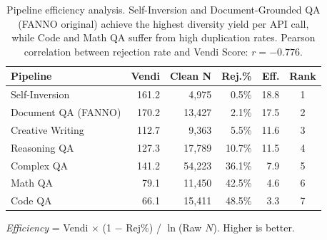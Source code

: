 \begin{table}[t]
\centering
\caption{Pipeline efficiency analysis. Self-Inversion and Document-Grounded QA (FANNO original) achieve the highest diversity yield per API call, while Code and Math QA suffer from high duplication rates. Pearson correlation between rejection rate and Vendi Score: $r=-0.776$.}
\label{tab:efficiency}
\small
\begin{tabular}{lrrrrc}
\toprule
\textbf{Pipeline} & \textbf{Vendi} & \textbf{Clean N} & \textbf{Rej.\%} & \textbf{Eff.} & \textbf{Rank} \\
\midrule
Self-Inversion      & 161.2 &  4,975 &  0.5\% & 18.8 & \colorbox{green!20}{1} \\
Document QA (FANNO) & 170.2 & 13,427 &  2.1\% & 17.5 & \colorbox{green!20}{2} \\
Creative Writing    & 112.7 &  9,363 &  5.5\% & 11.6 & 3 \\
Reasoning QA        & 127.3 & 17,789 & 10.7\% & 11.5 & 4 \\
Complex QA          & 141.2 & 54,223 & 36.1\% &  7.9 & 5 \\
Math QA             &  79.1 & 11,450 & 42.5\% &  4.6 & 6 \\
Code QA             &  66.1 & 15,411 & 48.5\% &  3.3 & \colorbox{red!15}{7} \\
\bottomrule
\end{tabular}
\vspace{-0.5em}
\begin{flushleft}
\scriptsize\textit{Efficiency} = Vendi $\times$ (1 $-$ Rej\%) / $\ln$(Raw $N$). Higher is better.
\end{flushleft}
\end{table}